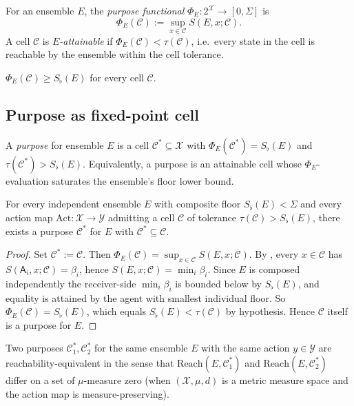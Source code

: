\documentclass[11pt,a4paper]{article}
\newcommand{\X}{\mathcal{X}}
\newcommand{\Y}{\mathcal{Y}}
\newcommand{\Cell}{\mathcal{C}}
\newcommand{\agent}{\mathsf{A}}
\newcommand{\Sfloor}{S_{\flat}}
\newcommand{\Action}{\mathrm{Act}}
\newcommand{\Reach}{\mathrm{Reach}}
\begin{document}
\begin{definition}\label{def:purp-func}
For an ensemble $E$, the \emph{purpose functional}
$\Phi_E:2^\X\to[0,\Sigma]$ is
\[
\Phi_E(\Cell):=\sup_{x\in\Cell}S(E,x;\Cell).
\]
A cell $\Cell$ is \emph{$E$-attainable} if $\Phi_E(\Cell)<\tau(\Cell)$,
i.e.\ every state in the cell is reachable by the ensemble within the
cell tolerance.
\end{definition}

\begin{proposition}\label{prop:phi-lb}
$\Phi_E(\Cell)\ge\Sfloor(E)$ for every cell $\Cell$.
\end{proposition}

\subsection{Purpose as fixed-point cell}

\begin{definition}[Purpose]\label{def:purpose}
A \emph{purpose} for ensemble $E$ is a cell $\Cell^*\subseteq\X$ with
$\Phi_E(\Cell^*)=\Sfloor(E)$ and $\tau(\Cell^*)>\Sfloor(E)$.
Equivalently, a purpose is an attainable cell whose
$\Phi_E$-evaluation saturates the ensemble's floor lower bound.
\end{definition}

\begin{theorem}\label{thm:purp-exist}
For every independent ensemble $E$ with composite floor $\Sfloor(E)<
\Sigma$ and every action map $\Action:\X\to\Y$ admitting a cell
$\Cell$ of tolerance $\tau(\Cell)>\Sfloor(E)$, there exists a
purpose $\Cell^*$ for $E$ with $\Cell^*\subseteq\Cell$.
\end{theorem}

\begin{proof}
Set $\Cell^*:=\Cell$. Then $\Phi_E(\Cell)=\sup_{x\in\Cell}
S(E,x;\Cell)$. By , every $x\in\Cell$ has
$S(\agent_i,x;\Cell)=\beta_i$, hence
$S(E,x;\Cell)=\min_i\beta_i$. Since $E$ is composed independently
the receiver-side $\min_i\beta_i$ is bounded below by
$\Sfloor(E)$, and equality is attained by the agent
with smallest individual floor. So $\Phi_E(\Cell)=\Sfloor(E)$,
which equals $\Sfloor(E)<\tau(\Cell)$ by hypothesis. Hence $\Cell$
itself is a purpose for $E$.
\end{proof}

\begin{theorem}
\label{thm:purp-unique}
Two purposes $\Cell^*_1,\Cell^*_2$ for the same ensemble $E$ with the
same action $y\in\Y$ are reachability-equivalent in the sense that
$\Reach(E,\Cell^*_1)$ and $\Reach(E,\Cell^*_2)$ differ on a set of
$\mu$-measure zero (when $(\X,\mu,d)$ is a metric measure space and
the action map is measure-preserving).
\end{theorem}
\end{document}

